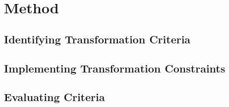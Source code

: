 \chapter{Method}

\section{Identifying Transformation Criteria}

\section{Implementing Transformation Constraints}

\section{Evaluating Criteria}

